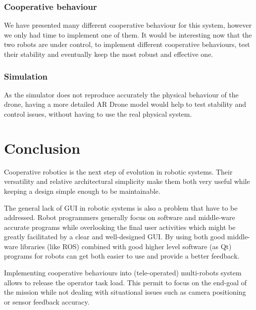 \documentclass[11pt,a4paper]{article}
\begin{document}
\subsubsection{Cooperative behaviour}
We have presented many different cooperative behaviour for this system, however we only had 
time to implement one of them. It would be interesting now that the two robots are under 
control, to implement
different cooperative behaviours, test their stability and eventually keep the most robust and 
effective
one.

\subsubsection{Simulation}
As the simulator does not reproduce accurately the physical behaviour of the drone, having a 
more detailed AR Drone model would help to test stability and control issues, without having 
to use the real physical system.

\clearpage
\section{Conclusion}
Cooperative robotics is the next step of evolution in robotic systems.
Their versatility and relative architectural simplicity make them both very useful while
keeping a design simple enough to be maintainable.

The general lack of GUI in robotic systems is also a problem that have to be addressed. 
Robot programmers generally focus on software and middle-ware accurate programs while 
overlooking the final user activities which might be greatly facilitated by a clear and 
well-designed GUI.
By using both good middle-ware libraries (like ROS) combined with good higher level
software (as Qt) programs for robots can get both easier to use and provide a better 
feedback.

Implementing cooperative behaviours into (tele-operated) multi-robots system allows to release 
the operator task load. This permit to focus on the end-goal of the mission while not dealing 
with situational issues such as camera positioning or sensor feedback accuracy.


\end{document}
